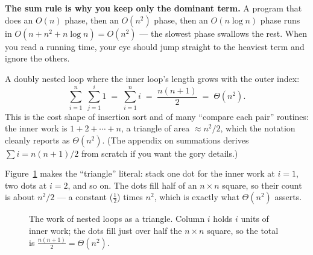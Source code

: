 \begin{focusbox}
\textbf{The sum rule is why you keep only the dominant term.} A program that does an
$O(n)$ phase, then an $O(n^2)$ phase, then an $O(n\log n)$ phase runs in
$O(n + n^2 + n\log n) = O(n^2)$ --- the slowest phase swallows the rest. When you read a
running time, your eye should jump straight to the heaviest term and ignore the others.
\end{focusbox}

\begin{example}\label{ch03:ex-nested-loops}
A doubly nested loop where the inner loop's length grows with the outer index:
\[
  \sum_{i=1}^{n}\; \sum_{j=1}^{i} 1 \;=\; \sum_{i=1}^{n} i \;=\; \frac{n(n+1)}{2}
  \;=\; \Theta(n^2).
\]
This is the cost shape of insertion sort and of many ``compare each pair'' routines:
the inner work is $1 + 2 + \cdots + n$, a triangle of area $\approx n^2/2$, which the
notation cleanly reports as $\Theta(n^2)$. (The appendix on summations derives
$\sum i = n(n+1)/2$ from scratch if you want the gory details.)

Figure~\ref{ch03:fig-triangle} makes the ``triangle'' literal: stack one dot for the
inner work at $i=1$, two dots at $i=2$, and so on. The dots fill half of an
$n\times n$ square, so their count is about $n^2/2$ --- a constant ($\tfrac12$) times
$n^2$, which is exactly what $\Theta(n^2)$ asserts.

\begin{figure}[H]
\centering
{}
\caption{The work of nested loops as a triangle. Column $i$ holds $i$ units of inner
work; the dots fill just over half the $n\times n$ square, so the total is
$\tfrac{n(n+1)}{2} = \Theta(n^2)$.}
\label{ch03:fig-triangle}
\end{figure}
\end{example}

